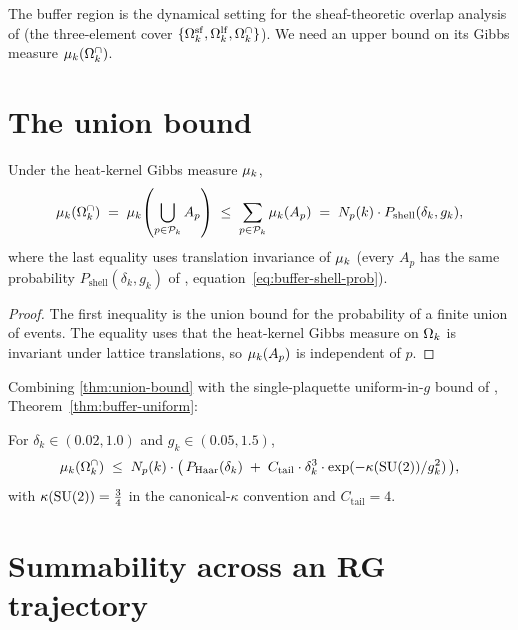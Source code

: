 The buffer region is the dynamical setting for the sheaf-theoretic
overlap analysis of  (the three-element
cover $\{\Omega_k^{\mathrm{sf}}, \Omega_k^{\mathrm{lf}}, \Omega_k^{\cap}\}$).  We need an upper bound on
its Gibbs measure $\mu_k(\Omega_k^{\cap})$.

\section{The union bound}
\label{sec:union-bound}

%

\begin{theorem}
\label{thm:union-bound}
Under the heat-kernel Gibbs measure $\mu_k$,
\begin{equation}
  \label{eq:union-bound}
  \mu_k(\Omega_k^{\cap})
  \;=\;
  \mu_k\!\left(\bigcup_{p \in \mathcal{P}_k} A_p\right)
  \;\le\;
  \sum_{p \in \mathcal{P}_k} \mu_k(A_p)
  \;=\;
  N_p(k) \cdot P_{\mathrm{shell}}(\delta_k, g_k),
\end{equation}
where the last equality uses translation invariance of $\mu_k$
(every $A_p$ has the same probability $P_{\mathrm{shell}}(\delta_k,
g_k)$ of ,
equation~\eqref{eq:buffer-shell-prob}).
\end{theorem}

\begin{proof}
The first inequality is the union bound for the probability of a
finite union of events.  The equality uses that the heat-kernel
Gibbs measure on $\Omega_k$ is invariant under lattice translations, so
$\mu_k(A_p)$ is independent of $p$.
\end{proof}

Combining \cref{thm:union-bound} with the single-plaquette
uniform-in-$g$ bound of ,
Theorem~\ref{thm:buffer-uniform}:

\begin{corollary}
\label{cor:aggregate-bound}
For $\delta_k \in (0.02, 1.0)$ and $g_k \in (0.05, 1.5)$,
\begin{equation}
  \label{eq:aggregate-bound}
  \mu_k(\Omega_k^{\cap})
  \;\le\;
  N_p(k) \cdot \bigl(\, P_{\mathrm{Haar}}(\delta_k)
    \;+\; C_{\mathrm{tail}} \cdot \delta_k^3 \cdot \exp(-\kappa(\mathrm{SU}(2)) / g_k^2)\,\bigr) ,
\end{equation}
with $\kappa(\mathrm{SU}(2)) = \tfrac34$ in the canonical-$\kappa$
convention and $C_{\mathrm{tail}} = 4$.
\end{corollary}

\section{Summability across an RG trajectory}
\label{sec:overlap-summability}

